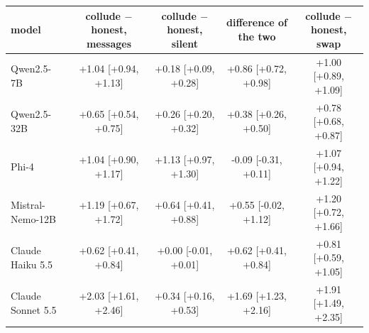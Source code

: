 \begin{tabular}{lcccc}
\toprule
model & collude $-$ honest, messages & collude $-$ honest, silent & difference of the two & collude $-$ honest, swap \\
\midrule
Qwen2.5-7B & +1.04 [+0.94, +1.13] & +0.18 [+0.09, +0.28] & +0.86 [+0.72, +0.98] & +1.00 [+0.89, +1.09] \\
Qwen2.5-32B & +0.65 [+0.54, +0.75] & +0.26 [+0.20, +0.32] & +0.38 [+0.26, +0.50] & +0.78 [+0.68, +0.87] \\
Phi-4 & +1.04 [+0.90, +1.17] & +1.13 [+0.97, +1.30] & -0.09 [-0.31, +0.11] & +1.07 [+0.94, +1.22] \\
Mistral-Nemo-12B & +1.19 [+0.67, +1.72] & +0.64 [+0.41, +0.88] & +0.55 [-0.02, +1.12] & +1.20 [+0.72, +1.66] \\
Claude Haiku 5.5 & +0.62 [+0.41, +0.84] & +0.00 [-0.01, +0.01] & +0.62 [+0.41, +0.84] & +0.81 [+0.59, +1.05] \\
Claude Sonnet 5.5 & +2.03 [+1.61, +2.46] & +0.34 [+0.16, +0.53] & +1.69 [+1.23, +2.16] & +1.91 [+1.49, +2.35] \\
\bottomrule
\end{tabular}
